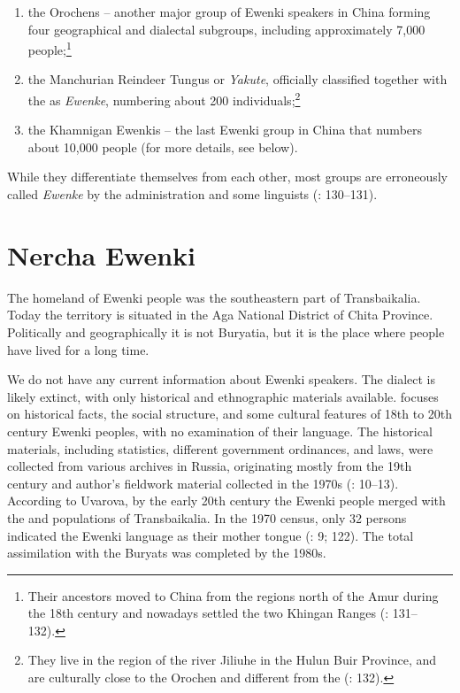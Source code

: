 \documentclass[output=paper,colorlinks,citecolor=brown]{langscibook}
\begin{document}
\begin{enumerate}
\begin{enumerate}
    \item the Orochens – another major group of Ewenki speakers in China forming four geographical and dialectal subgroups, including approximately 7,000 people;\footnote{Their ancestors moved to China from the regions north of the Amur during the 18th century and nowadays settled the two Khingan Ranges (\citealt{Janhunen1997}: 131--132).}
    
    \item the Manchurian Reindeer Tungus or \textit{Yakute}, officially classified together with the  as \textit{Ewenke}, numbering about 200 individuals;\footnote{They live in the region of the river Jiliuhe in the Hulun Buir Province, and are culturally close to the Orochen and different from the  (\citealt{Janhunen1997}: 132).}
    
    \item the Khamnigan Ewenkis – the last Ewenki group in China that numbers about 10,000 people (for more details, see below).
\end{enumerate}
\end{enumerate}

While they differentiate themselves from each other, most groups are erroneously called \textit{Ewenke} by the administration and some  linguists (\citealt{Janhunen1997}: 130--131).


\section{Nercha Ewenki}

The homeland of  Ewenki people was the southeastern part of Transbaikalia. Today the territory is situated in the Aga  National District of Chita Province. Politically and geographically it is not Buryatia, but it is the place where  people have lived for a long time.

We do not have any current information about  Ewenki speakers. The dialect is likely extinct, with only historical and ethnographic materials available. \citet{Uvarova2006} focuses on historical facts, the social structure, and some cultural features of 18th to 20th century  Ewenki peoples, with no examination of their language. The historical materials, including statistics, different government ordinances, and laws, were collected from various archives in Russia, originating mostly from the 19th century and author’s fieldwork material collected in the 1970s (\citealt{Uvarova2006}: 10--13). According to Uvarova, by the early 20th century the  Ewenki people merged with the  and  populations of Transbaikalia. In the 1970 census, only 32 persons indicated the Ewenki language as their mother tongue (\citealt{Uvarova2006}: 9; 122). The total assimilation with the Buryats was completed by the 1980s.
\end{document}
